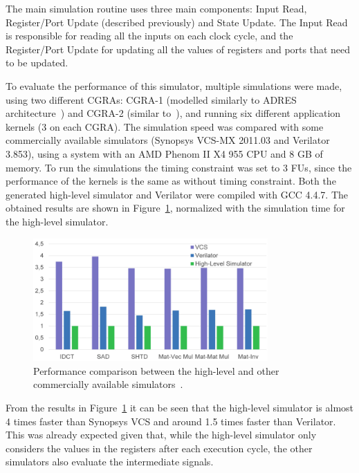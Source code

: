 The main simulation routine uses three main components: Input Read,
Register/Port Update (described previously) and State Update. The Input Read is
responsible for reading all the inputs on each clock cycle, and the
Register/Port Update for updating all the values of registers and ports that
need to be updated.

To evaluate the performance of this simulator, multiple simulations were made,
using two different \ac{CGRA}s: \ac{CGRA}-1 (modelled similarly to ADRES
architecture~\cite{mei:reconfigurable}) and \ac{CGRA}-2 (similar
to~\cite{chen:flexdet}), and running six different application kernels (3 on
each \ac{CGRA}). The simulation speed was compared with some commercially
available simulators (Synopsys VCS-MX 2011.03 and Verilator 3.853), using a
system with an AMD Phenom II X4 955 CPU and 8 GB of memory. To run the
simulations the timing constraint was set to 3 \ac{FU}s, since the performance
of the kernels is the same as without timing constraint. Both the generated
high-level simulator and Verilator were compiled with GCC 4.4.7. The obtained
results are shown in Figure~\ref{fig:hlperformance}, normalized with the
simulation time for the high-level simulator.

\begin{figure}[!htb]
	\centering
	\includegraphics[width=0.8\textwidth]{Figures/hlperformance.png}
	\caption{Performance comparison between the high-level and other commercially 
		available
		simulators~\cite{chen:CGRA}.}
	\label{fig:hlperformance}
\end{figure}

From the results in Figure~\ref{fig:hlperformance} it can be seen that the
high-level simulator is almost 4 times faster than Synopsys VCS and around 1.5
times faster than Verilator. This was already expected given that, while the
high-level simulator only considers the values in the registers after each
execution cycle, the other simulators also evaluate the intermediate signals.

